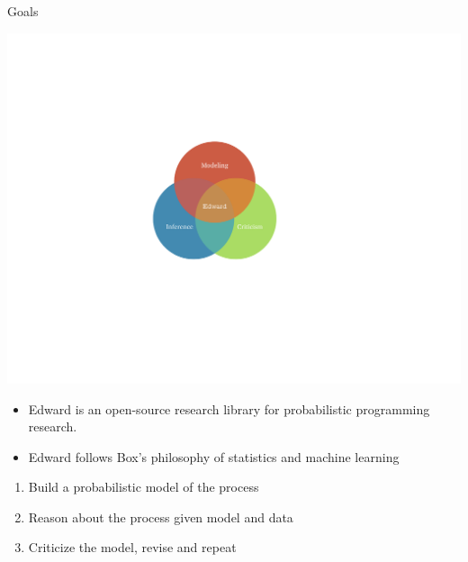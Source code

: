 \documentclass{beamer}
\begin{document}
\begin{frame}[t]
\begin{columns}[t,totalwidth=10in]
\begin{column}{\onecolwid}
\begin{block}{Goals}
\begin{center}
\includegraphics[width=9in]{img/edward_venn.pdf}
\end{center}
\begin{itemize}
  \item Edward is an open-source research library for probabilistic programming
  research.\newline
  \item Edward follows Box's philosophy of statistics and machine learning
  \citep{box1976science}
\end{itemize}
\begin{enumerate}
  \item Build a probabilistic model of the process
  \item Reason about the process given model and data
  \item Criticize the model, revise and repeat
\end{enumerate}
\end{block}


\end{column}
\end{columns}
\end{frame}
\end{document}
